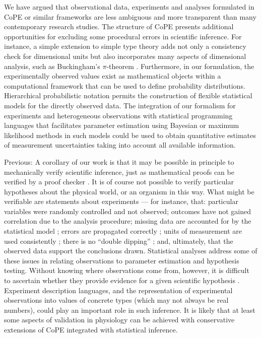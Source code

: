 We have argued that observational data, experiments and analyses
formulated in CoPE or similar frameworks are less ambiguous and more
transparent than many contemporary research studies. The structure of
CoPE presents additional opportunities for excluding some procedural
errors in scientific inference. For instance, a simple extension to
simple type theory adds not only a consistency check for dimensional
units but also incorporates many aspects of dimensional analysis, such
as Buckingham's $\pi$-theorem \citep{Kennedy1997}. Furthermore, in our
formulation, the experimentally observed values exist as mathematical
objects within a computational framework that can be used to define
probability distributions. Hierarchical probabilistic notation
\citep{Gelman2006} permits the construction of flexible statistical
models for the directly observed data. The integration of our
formalism for experiments and heterogeneous observations with
statistical programming languages \citep{Gilks1994, AutoBayes,mlwin}
that facilitates parameter estimation using Bayesian or maximum
likelihood methods in such models could be used to obtain quantitative
estimates of measurement uncertainties taking into account all
available information.

Previous: A corollary of our work is that it may be possible in
principle to mechanically verify scientific inference, just as
mathematical proofs can be verified by a proof checker
\citep{DeBruijn1968, Harrison2009}. It is of course not possible to
verify particular hypotheses about the physical world, or an organism
in this way. What might be verifiable are statements about experiments
--- for instance, that: particular variables were randomly controlled
and not observed; outcomes have not gained correlation due to the
analysis procedure; missing data are accounted for by the statistical
model \citep{Gelman2003}; errors are propagated correctly
\citep{Taylor1997}; units of measurement are used consistently
\citep{Kennedy1997}; there is no ``double dipping''
\citep{Kriegeskorte2009}; and, ultimately, that the observed data
support the conclusions drawn. Statistical analyses address some of
these issues in relating observations to parameter estimation and
hypothesis testing. Without knowing where observations come from,
however, it is difficult to ascertain whether they provide evidence
for a given scientific hypothesis \citep{Pool2002}. Experiment
description languages, and the representation of experimental
observations into values of concrete types (which may not always be
real numbers), could play an important role in such inference. It is
likely that at least some aspects of validation in physiology can be
achieved with conservative extensions of
CoPE integrated with statistical inference.

